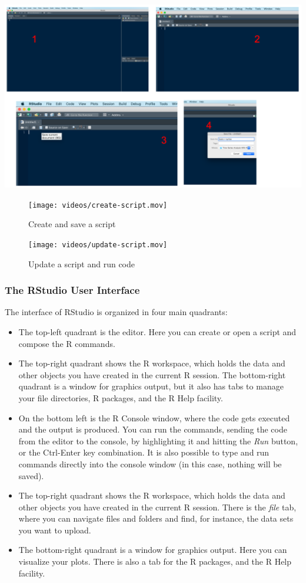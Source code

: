 \documentclass[
]{article}
\providecommand{\tightlist}{%
  \setlength{\itemsep}{0pt}\setlength{\parskip}{0pt}}
\begin{document}
\includegraphics[width=29.9in]{images/create-script}

\begin{figure}
\centering
\texttt{[image: videos/create-script.mov]}
\caption{Create and save a script}
\end{figure}

\begin{figure}
\centering
\texttt{[image: videos/update-script.mov]}
\caption{Update a script and run code}
\end{figure}

\hypertarget{the-rstudio-user-interface}{%
\subsubsection{The RStudio User Interface}\label{the-rstudio-user-interface}}

The interface of RStudio is organized in four main quadrants:

\begin{itemize}
\tightlist
\item
  The top-left quadrant is the editor. Here you can create or open a script and compose the R commands.
\item
  The top-right quadrant shows the R workspace, which holds the data and other objects you have created in the current R session. The bottom-right quadrant is a window for graphics output, but it also has tabs to manage your file directories, R packages, and the R Help facility.
\item
  On the bottom left is the R Console window, where the code gets executed and the output is produced. You can run the commands, sending the code from the editor to the console, by highlighting it and hitting the \emph{Run} button, or the Ctrl-Enter key combination. It is also possible to type and run commands directly into the console window (in this case, nothing will be saved).
\item
  The top-right quadrant shows the R workspace, which holds the data and other objects you have created in the current R session. There is the \emph{file} tab, where you can navigate files and folders and find, for instance, the data sets you want to upload.
\item
  The bottom-right quadrant is a window for graphics output. Here you can visualize your plots. There is also a tab for the R packages, and the R Help facility.
\end{itemize}
\end{document}
